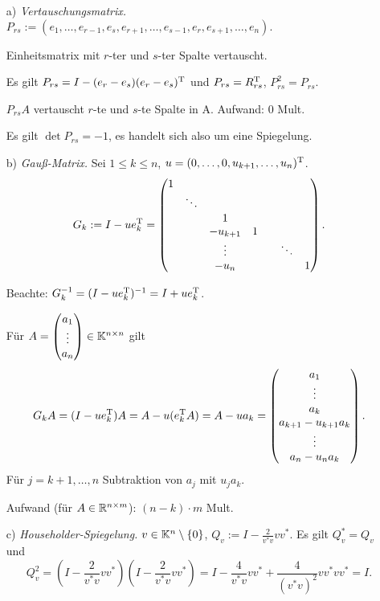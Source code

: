 \begin{Beispiele}[Elementarmatrizen]
\quad
\begin{itemize}
\item[a)] \emph{Vertauschungsmatrix.}
  $P_{rs} := (e_1,\ldots,e_{r-1},e_s,e_{r+1},\ldots,e_{s-1},e_r,e_{s+1},\ldots,e_n).$

  Einheitsmatrix mit $r$-ter und $s$-ter Spalte vertauscht.

  Es gilt $P_{rs} = I - (e_r - e_s)(e_r - e_s)^\mathrm T$ und $P_{rs} = R_{rs}^\mathrm T$,
  $P_{rs}^2 = P_{rs}$.
  
  $P_{rs} A$ vertauscht $r$-te und $s$-te Spalte in A. Aufwand: 0 Mult.
  
  Es gilt $\det P_{rs} = -1$, es handelt sich also um eine Spiegelung.

\item[b)] \emph{Gauß-Matrix.}
  Sei $1 \le k \le n$, $u = (0, \ldots, 0, u_{k+1}, \ldots, u_n)^\mathrm T$.
  \[
    G_k := I - ue_k^\mathrm T = \begin{pmatrix}
      1 & & & \\
      & \ddots & & & \\
      & & 1 & & \\
      & & -u_{k+1} & 1 & \\
      & & \vdots & & & \ddots \\
      & & -u_n & & & & 1 \\
    \end{pmatrix}.
  \]

  Beachte: $G^{-1}_k = (I - ue_k^\mathrm T)^{-1} = I + ue_k^\mathrm T$.

  Für $A = \begin{pmatrix} a_1 \\ \vdots \\ a_n \end{pmatrix} \in \mathbb K^{n\times n}$
  gilt \[
    G_k A = (I - ue_k^\mathrm T) A = A - u(e_k^\mathrm T A) = A - ua_k
          = \begin{pmatrix} a_1 \\ \vdots \\ a_k \\ a_{k+1} - u_{k+1} a_k \\ \vdots \\ a_n - u_n a_k \end{pmatrix}.
  \]
  Für $j = k+1, \ldots, n$ Subtraktion von $a_j$ mit $u_j a_k$.

  Aufwand (für $A \in \mathbb R^{n\times m}$): $(n-k) \cdot m$ Mult.

\item[c)] \emph{Householder-Spiegelung.}
  $v \in \mathbb K^n \setminus \{0\}$, $Q_v := I - \frac{2}{v^{*}v}vv^{*}.$
  Es gilt $Q_v^{*} = Q_v$ und \[
    Q_v^2 =  \left( I - \frac{2}{v^{*}v}vv^{*} \right)
             \left( I - \frac{2}{v^{*}v}vv^{*} \right)
          = I - \frac{4}{v^*v}vv^* + \frac{4}{(v^*v)^2}vv^*vv^* = I.    
  \]


\end{itemize}
\end{Beispiele}
